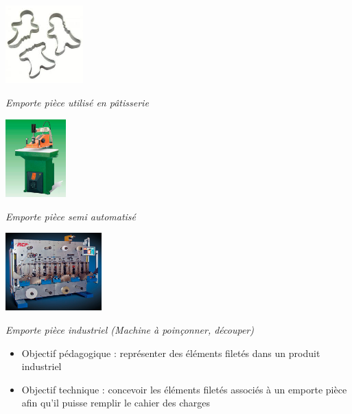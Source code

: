 \documentclass[11pt,oneside]{article}
\begin{document}
\begin{minipage}[c]{.3\linewidth}
\begin{center}
\includegraphics[height=3cm]{png/piece1}

\textit{Emporte pièce utilisé en pâtisserie}
\end{center}
\end{minipage}\hfill
\begin{minipage}[c]{.3\linewidth}
\begin{center}
\includegraphics[height=3cm]{png/piece2}

\textit{Emporte pièce semi automatisé}
\end{center}
\end{minipage}\hfill
\begin{minipage}[c]{.3\linewidth}
\begin{center}
\includegraphics[height=3cm]{png/piece3}

\textit{Emporte pièce industriel (Machine à poinçonner, découper)}
\end{center}
\end{minipage}

\begin{contexte}
\begin{itemize}
\item Objectif pédagogique : représenter des éléments filetés dans un produit industriel
\item Objectif technique : concevoir les éléments filetés associés à un emporte pièce afin qu'il puisse remplir le cahier des charges
\end{itemize}
\end{contexte}
\end{document}
